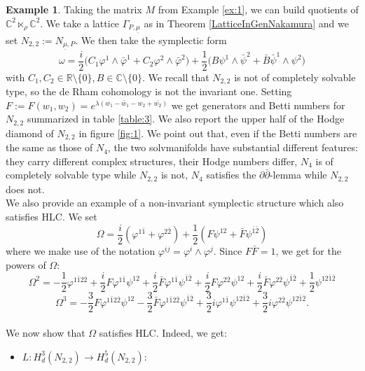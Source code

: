 \documentclass[a4paper, 11pt]{amsart}
\theoremstyle{plain}
\theoremstyle{definition}
\newtheorem{esempio}{Example}[section]
\newcommand{\del}{\partial}
\newcommand{\delbar}{\bar{\partial}}
\newcommand{\C}{\mathbb{C}}
\numberwithin{equation}{section}
\begin{document}
\begin{esempio}\label{ex:3}
    Taking the matrix $M$ from Example \eqref{ex:1}, we can build quotients of $\C^{2} \ltimes_{\rho} \C^{2}$. We take a lattice $\Gamma_{P, \underline{\mu}}$ as in Theorem \ref{LatticeInGenNakamura} and we set $N_{2,2} := N_{\underline{\mu},P}$. We then take the symplectic form 
    \[\omega = \dfrac{i}{2}\bigl(C_{1}\varphi^{1} \wedge \bar\varphi^{1} + C_{2}\varphi^{2} \wedge \bar\varphi^{2}\bigr) + \dfrac{1}{2}\bigl(B\psi^{1} \wedge \bar\psi^{2} + \bar B\bar\psi^{1} \wedge \psi^{2}\bigr)\]
    with $C_{1}, C_{2} \in \mathbb{R} \setminus \{0\}, B \in \C \setminus \{0\}$. We recall that $N_{2,2}$ is not of completely solvable type, so the de Rham cohomology is not the invariant one. Setting $F := F(w_{1}, w_{2}) = e^{\lambda(w_{1} - \bar w_{1} - w_{2} + \bar{w_{2}})}$ we get generators and Betti numbers for $N_{2,2}$ summarized in table \ref{table:3}. We also report the upper half of the Hodge diamond of $N_{2,2}$ in figure \ref{fig:1}. We point out that, even if the Betti numbers are the same as those of $N_{4}$, the two solvmanifolds have substantial different features: they carry different complex structures, their Hodge numbers differ, $N_{4}$ is of completely solvable type while $N_{2,2}$ is not, $N_{4}$ satisfies the $\del\delbar$-lemma while $N_{2,2}$ does not.\\
    We also provide an example of a non-invariant symplectic structure which also satisfies HLC. We set
    \[\Omega = \dfrac{i}{2}(\varphi^{1\bar1} + \varphi^{2\bar2}) + \dfrac{1}{2}(F\psi^{12} + \bar F\psi^{\bar1\bar2})\]
    where we make use of the notation $\varphi^{ij} = \varphi^{i} \wedge \varphi^{j}$. Since $F\bar F = 1$, we get for the powers of $\Omega$:
    \[\Omega^{2} = -\dfrac{1}{2}\varphi^{1\bar12\bar2} + \dfrac{i}{2}F\varphi^{1\bar1}\psi^{12} + \dfrac{i}{2}\bar F\varphi^{1\bar1}\psi^{\bar1\bar2} + \dfrac{i}{2}F\varphi^{2\bar2}\psi^{12} + \dfrac{i}{2}\bar F\varphi^{2\bar2}\psi^{\bar1\bar2} + \dfrac{1}{2}\psi^{12\bar1\bar2}\]
    \[\Omega^{3} = -\dfrac{3}{2}F\varphi^{1\bar12\bar2}\psi^{12} -\dfrac{3}{2}\bar F\varphi^{1\bar12\bar2}\psi^{\bar1\bar2} +\dfrac{3}{2}i\varphi^{1\bar1}\psi^{12\bar1\bar2} +\dfrac{3}{2}i\varphi^{2\bar2}\psi^{12\bar1\bar2}.\]\\
    We now show that $\Omega$ satisfies HLC. Indeed, we get:
    \begin{itemize}
        \item $L: H^{3}_{d}(N_{2,2}) \rightarrow H^{5}_{d}(N_{2,2})$:
        \begin{gather*}

\end{gather*}
\end{itemize}
\end{esempio}
\end{document}
